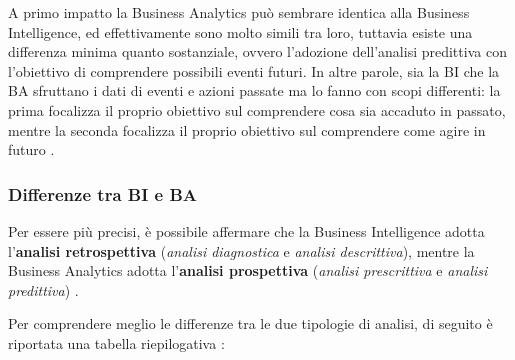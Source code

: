 A primo impatto la Business Analytics può sembrare identica alla Business Intelligence, ed effettivamente sono molto simili tra loro, tuttavia esiste una differenza minima quanto sostanziale, ovvero l'adozione dell'analisi predittiva con l'obiettivo di comprendere possibili eventi futuri. In altre parole, sia la BI che la BA sfruttano i dati di eventi e azioni passate ma lo fanno con scopi differenti: la prima focalizza il proprio obiettivo sul comprendere cosa sia accaduto in passato, mentre la seconda focalizza il proprio obiettivo sul comprendere come agire in futuro \cite{talend_bi_vs_ba}.


\subsubsection{Differenze tra BI e BA}
Per essere più precisi, è possibile affermare che la Business Intelligence adotta l'\textbf{analisi retrospettiva} (\textit{analisi diagnostica} e \textit{analisi descrittiva}), mentre la Business Analytics adotta l'\textbf{analisi prospettiva} (\textit{analisi prescrittiva} e \textit{analisi predittiva}) \cite{researchgate_bi_and_ba_analytics}.

Per comprendere meglio le differenze tra le due tipologie di analisi, di seguito è riportata una tabella riepilogativa \cite{knowledgehut_bi_vs_ba}:

